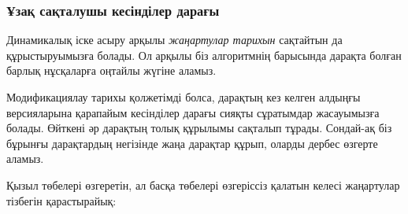 
\subsubsection{Ұзақ сақталушы кесінділер дарағы}


Динамикалық іске асыру арқылы
\emph{жаңартулар тарихын} сақтайтын 
да құрыстыруымызға болады. Ол арқылы біз алгоритмнің 
барысында дарақта болған барлық нұсқаларға оңтайлы жүгіне
аламыз. 


Модификациялау тарихы қолжетімді болса, дарақтың 
кез келген алдыңғы версияларына қарапайым кесінділер 
дарағы сияқты сұратымдар жасауымызға болады. Өйткені әр дарақтың толық құрылымы сақталып тұрады. Сондай-ақ біз бұрынғы дарақтардың  негізінде жаңа дарақтар құрып, 
оларды дербес өзгерте аламыз. 


Қызыл төбелері өзгеретін, ал басқа төбелері өзгеріссіз қалатын келесі жаңартулар тізбегін қарастырайық:


